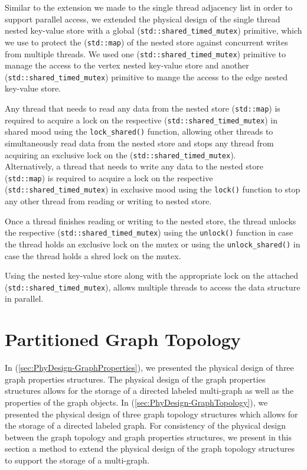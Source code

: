 {Similar to the extension we made to the single thread adjacency list in order to support parallel access, we extended the physical design of the single thread nested key-value store with a global (\texttt{std::shared\_timed\_mutex}) primitive, which we use to protect the (\texttt{std::map}) of the nested store against concurrent writes from multiple threads. We used one (\texttt{std::shared\_timed\_mutex}) primitive to manage the access to the vertex nested key-value store and another (\texttt{std::shared\_timed\_mutex}) primitive to mange the access to the edge nested key-value store.

Any thread that needs to read any data from the nested store (\texttt{std::map}) is required to acquire a lock on the respective (\texttt{std::shared\_timed\_mutex}) in shared mood using the \texttt{lock\_shared()} function, allowing other threads to simultaneously read data from the nested store and stops any thread from acquiring an exclusive lock on the (\texttt{std::shared\_timed\_mutex}). 
\\
Alternatively, a thread that needs to write any data to the nested store (\texttt{std::map}) is required to acquire a lock on the respective (\texttt{std::shared\_timed\_mutex}) in exclusive mood using the \texttt{lock()} function to stop any other thread from reading or writing to nested store. 

Once a thread finishes reading or writing to the nested store, the thread unlocks the respective (\texttt{std::shared\_timed\_mutex}) using the  \texttt{unlock()} function in case the thread holds an exclusive lock on the mutex or using the  \texttt{unlock\_shared()} in case the thread holds a shred lock on the mutex.

Using the nested key-value store along with the appropriate lock on the attached (\texttt{std::shared\_timed\_mutex}), allows multiple threads to access the data structure in parallel.


\section{Partitioned Graph Topology}
\label{sec:PhyDesign-GraphPartitioning}

In (\ref{sec:PhyDesign-GraphProperties}), we presented the physical design of three graph properties structures. The physical design of the graph properties structures allows for the storage of a directed labeled multi-graph as well as the properties of the graph objects. In (\ref{sec:PhyDesign-GraphTopology}), we presented the physical design of three graph topology structures which allows for the storage of a directed labeled graph. For consistency of the physical design between the graph topology and graph properties structures, we present in this section a method to extend the physical design of the graph topology structures to support the storage of a multi-graph. 

}
